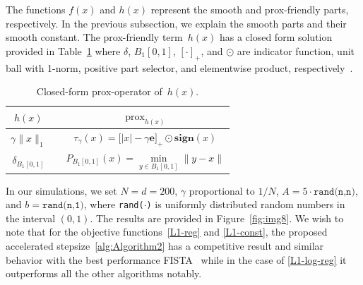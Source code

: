 \documentclass[11pt, a4paper, oneside, reqno]{amsart}
\begin{document}
The functions $f(x)$ and $h(x)$ represent the smooth and prox-friendly parts, respectively. In the previous subsection, we explain the smooth parts and their smooth constant. The prox-friendly term~$h(x)$ has a closed form solution provided in Table~\ref{table2} where $\delta$, $B_1 [0,1]$, $[\cdot]_+$, and $\odot$ are indicator function, unit ball with 1-norm, positive part selector, and elementwise product, respectively~\cite{Beck2017}. 
\begin{table}[H]
    \centering
    \caption{Closed-form prox-operator of~$h(x)$.}
    \begin{tabular}{ccc}
    \hline
         {$h(x)$} && {$\text{prox}_{h(x)}$}\\
         \hline
         $\gamma\|x\|_1$ && $\tau_{\gamma}(x) = \big[|x| - \gamma \textbf{e}\big]_{+} \odot \textbf{sign}(x)$ \vspace{1mm} \\ 
         $\delta_{B_1[0, 1]}$ && $P_{B_1[0, 1]}(x) = \min\limits_{y \in {B_1[0, 1]}} \|y-x\|$\\
         \hline
    \end{tabular}
    \label{table2}
\end{table}

In our simulations, we set $N = d = 200$, $\gamma$ proportional to ${1}/{N}$, $A = 5\cdot\texttt{rand(n,n)}$, and $b=\texttt{rand(n,1)}$, where \texttt{rand($\cdot $)} is uniformly distributed random numbers in the interval $(0,1)$. The results are provided in Figure~\ref{fig:img8}. We wish to note that for the objective functions~\eqref{L1-reg} and \eqref{L1-const}, the proposed accelerated stepsize~\ref{alg:Algorithm2} has a competitive result and similar behavior with the best performance FISTA~\cite{Beck2009} while in the case of \eqref{L1-log-reg} it outperforms all the other algorithms notably. 
\end{document}
